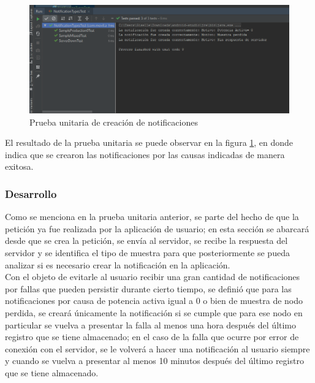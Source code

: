 \begin{figure}[H]
	\centering
	\includegraphics[scale=.7]{Capitulo5/images/pruebaUnitariaNotificaciones.png}
	\caption{Prueba unitaria de creación de notificaciones}	\label{fig:prueba unitaria notificaciones}
\end{figure} 

El resultado de la prueba unitaria se puede observar en la figura \ref{fig:prueba unitaria notificaciones}, en donde indica que se crearon las notificaciones por las causas indicadas de manera exitosa.

\subsubsection{Desarrollo}
Como se menciona en la prueba unitaria anterior, se parte del hecho de que la petición ya fue realizada por la aplicación de usuario; en esta sección se abarcará desde que se crea la petición, se envía al servidor, se recibe la respuesta del servidor y se identifica el tipo de muestra para que posteriormente se pueda analizar si es necesario crear la notificación en la aplicación. 
\\ \newline
Con el objeto de evitarle al usuario recibir una gran cantidad de notificaciones por fallas que pueden persistir durante cierto tiempo, se definió que para las notificaciones por causa de potencia activa igual a 0 o bien de muestra de nodo perdida, se creará únicamente la notificación si se cumple que para ese nodo en particular se vuelva a presentar la falla al menos una hora después del último registro que se tiene almacenado; en el caso de la falla que ocurre por error de conexión con el servidor, se le volverá a hacer una notificación al usuario siempre y cuando se vuelva a presentar al menos 10 minutos después del último registro que se tiene almacenado.

